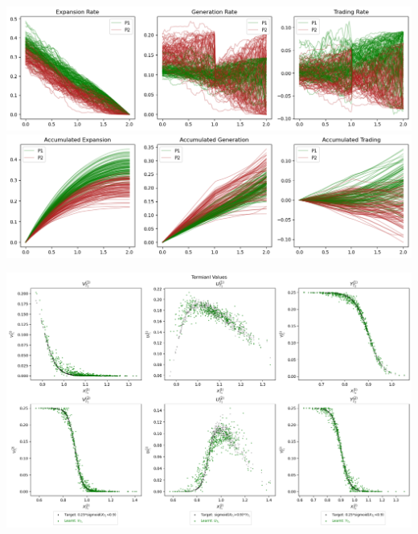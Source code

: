\documentclass[a4paper,10pt]{article}
\newcommand{\1}{\mathbf{1}}
\begin{document}
\begin{center}
\begin{minipage}[ht]{0.8\textwidth} 
    \includegraphics{FinalReports/Illustration_diagrams/Joint-2A2P-Sigmoid-ResExamples/Rates.png}\\
    \includegraphics{FinalReports/Illustration_diagrams/Joint-2A2P-Sigmoid-ResExamples/AccumRates.png}\\
    \vspace*{-10pt}
    \label{fig:decomp-gen-jnt}
\end{minipage}
\end{center}  

\vfill

\begin{center}
\begin{minipage}[ht]{0.85\textwidth}
    \includegraphics{FinalReports/Illustration_diagrams/Joint-2A2P-Sigmoid-ResExamples/sigmoid_target.png}\\
    \vspace*{-10pt}
    \label{fig:terminal-values-jnt}
\end{minipage}    
\end{center}
\end{document}

